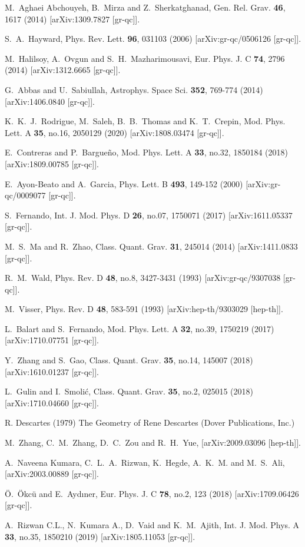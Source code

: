\documentclass[aps,11pt]{revtex4}
\begin{document}
\begin{thebibliography}{99}
{
M.~Aghaei Abchouyeh, B.~Mirza and Z.~Sherkatghanad,
Gen. Rel. Grav. \textbf{46}, 1617 (2014)
[arXiv:1309.7827 [gr-qc]].


S.~A.~Hayward,
Phys. Rev. Lett. \textbf{96}, 031103 (2006)
[arXiv:gr-qc/0506126 [gr-qc]].


M.~Halilsoy, A.~Ovgun and S.~H.~Mazharimousavi,
Eur. Phys. J. C \textbf{74}, 2796 (2014)
[arXiv:1312.6665 [gr-qc]].


G.~Abbas and U.~Sabiullah,
Astrophys. Space Sci. \textbf{352}, 769-774 (2014)
[arXiv:1406.0840 [gr-qc]].


K.~K.~J.~Rodrigue, M.~Saleh, B.~B.~Thomas and K.~T.~Crepin,
Mod. Phys. Lett. A \textbf{35}, no.16, 2050129 (2020)
[arXiv:1808.03474 [gr-qc]].


E.~Contreras and P.~Bargue\~no,
Mod. Phys. Lett. A \textbf{33}, no.32, 1850184 (2018)
[arXiv:1809.00785 [gr-qc]].


E.~Ayon-Beato and A.~Garcia,
Phys. Lett. B \textbf{493}, 149-152 (2000)
[arXiv:gr-qc/0009077 [gr-qc]].


S.~Fernando,
Int. J. Mod. Phys. D \textbf{26}, no.07, 1750071 (2017)
[arXiv:1611.05337 [gr-qc]].


M.~S.~Ma and R.~Zhao,
Class. Quant. Grav. \textbf{31}, 245014 (2014)
[arXiv:1411.0833 [gr-qc]].


R.~M.~Wald,
Phys. Rev. D \textbf{48}, no.8, 3427-3431 (1993)
[arXiv:gr-qc/9307038 [gr-qc]].


M.~Visser,
Phys. Rev. D \textbf{48}, 583-591 (1993)
[arXiv:hep-th/9303029 [hep-th]].


L.~Balart and S.~Fernando,
Mod. Phys. Lett. A \textbf{32}, no.39, 1750219 (2017)
[arXiv:1710.07751 [gr-qc]].


Y.~Zhang and S.~Gao,
Class. Quant. Grav. \textbf{35}, no.14, 145007 (2018)
[arXiv:1610.01237 [gr-qc]].


L.~Gulin and I.~Smoli\'c,
Class. Quant. Grav. \textbf{35}, no.2, 025015 (2018)
[arXiv:1710.04660 [gr-qc]].


   R. Descartes (1979) The Geometry of Rene Descartes
    (Dover Publications, Inc.)

M.~Zhang, C.~M.~Zhang, D.~C.~Zou and R.~H.~Yue,
[arXiv:2009.03096 [hep-th]].


A.~Naveena Kumara, C.~L.~A.~Rizwan, K.~Hegde, A.~K.~M. and M.~S.~Ali,
[arXiv:2003.00889 [gr-qc]].



\"O.~\"Okc\"u and E.~Ayd\i{}ner,
Eur. Phys. J. C \textbf{78}, no.2, 123 (2018)
[arXiv:1709.06426 [gr-qc]].


A.~Rizwan C.L., N.~Kumara A., D.~Vaid and K.~M.~Ajith,
Int. J. Mod. Phys. A \textbf{33}, no.35, 1850210 (2019)
[arXiv:1805.11053 [gr-qc]].


 }\
\end{thebibliography}
\end{document}
